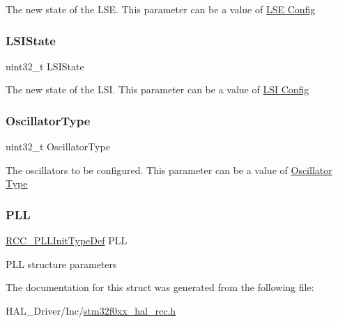The new state of the L\+SE. This parameter can be a value of \hyperlink{group___r_c_c___l_s_e___config}{L\+SE Config} \mbox{\label{struct_r_c_c___osc_init_type_def_a9acc15f6278f950ef02d5d6f819f68e8}} 
\subsubsection{\texorpdfstring{L\+S\+I\+State}{LSIState}}
{\footnotesize\ttfamily uint32\+\_\+t L\+S\+I\+State}

The new state of the L\+SI. This parameter can be a value of \hyperlink{group___r_c_c___l_s_i___config}{L\+SI Config} \mbox{\label{struct_r_c_c___osc_init_type_def_a23b9d1da2a92936c618d2416406275a3}} 
\subsubsection{\texorpdfstring{Oscillator\+Type}{OscillatorType}}
{\footnotesize\ttfamily uint32\+\_\+t Oscillator\+Type}

The oscillators to be configured. This parameter can be a value of \hyperlink{group___r_c_c___oscillator___type}{Oscillator Type} \mbox{\label{struct_r_c_c___osc_init_type_def_a7ec4025786fa81e2a4bfc42832c0eddf}} 
\subsubsection{\texorpdfstring{P\+LL}{PLL}}
{\footnotesize\ttfamily \hyperlink{struct_r_c_c___p_l_l_init_type_def}{R\+C\+C\+\_\+\+P\+L\+L\+Init\+Type\+Def} P\+LL}

P\+LL structure parameters 

The documentation for this struct was generated from the following file\+:\begin{DoxyCompactItemize}
\item 
H\+A\+L\+\_\+\+Driver/\+Inc/\hyperlink{stm32f0xx__hal__rcc_8h}{stm32f0xx\+\_\+hal\+\_\+rcc.\+h}\end{DoxyCompactItemize}
